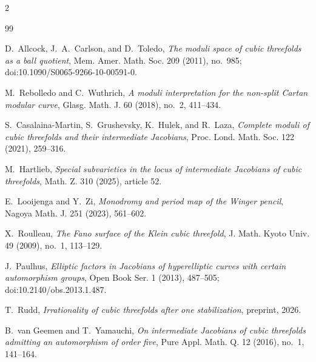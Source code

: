 \documentclass[11pt]{article}
\numberwithin{equation}{section}
\theoremstyle{definition}
\theoremstyle{remark}
\begin{document}
\scriptsize
\begin{multicols}{2}
\raggedcolumns
\sloppy
\raggedright
\begin{thebibliography}{99}

D.~Allcock, J.~A.~Carlson, and D.~Toledo,
\emph{The moduli space of cubic threefolds as a ball quotient},
Mem. Amer. Math. Soc. 209 (2011), no.~985;
doi:10.1090/S0065-9266-10-00591-0.

M.~Rebolledo and C.~Wuthrich,
\emph{A moduli interpretation for the non-split Cartan modular curve},
Glasg. Math. J. 60 (2018), no.~2, 411--434.

S.~Casalaina-Martin, S.~Grushevsky, K.~Hulek, and R.~Laza,
\emph{Complete moduli of cubic threefolds and their intermediate Jacobians},
Proc. Lond. Math. Soc. 122 (2021), 259--316.

M.~Hartlieb,
\emph{Special subvarieties in the locus of intermediate Jacobians of cubic
threefolds}, Math. Z. 310 (2025), article 52.

E.~Looijenga and Y.~Zi,
\emph{Monodromy and period map of the Winger pencil},
Nagoya Math. J. 251 (2023), 561--602.

X.~Roulleau,
\emph{The Fano surface of the Klein cubic threefold},
J. Math. Kyoto Univ. 49 (2009), no.~1, 113--129.

J.~Paulhus,
\emph{Elliptic factors in Jacobians of hyperelliptic curves with certain
automorphism groups},
Open Book Ser. 1 (2013), 487--505;
doi:10.2140/obs.2013.1.487.

T.~Rudd,
\emph{Irrationality of cubic threefolds after one stabilization},
preprint, 2026.

B.~van Geemen and T.~Yamauchi,
\emph{On intermediate Jacobians of cubic threefolds admitting an
automorphism of order five},
Pure Appl. Math. Q. 12 (2016), no.~1, 141--164.

\end{thebibliography}
\end{multicols}
\end{document}
